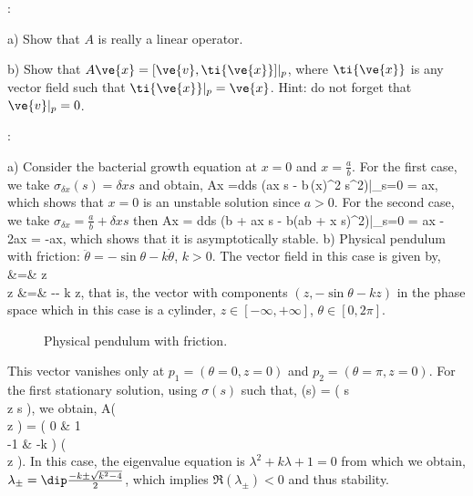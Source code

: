 \espa
\noi
{}:

\noi
a) Show that $A$ is really a linear operator.

\espa
\noi
b) Show that $A\ve{x} = [\ve{v},\ti{\ve{x}}]|_p$, where $\ti{\ve{x}}$ is any vector field such that $\ti{\ve{x}}|_p = \ve{x}$. Hint: do not forget that $\ve{v}|_p = 0$.

\espa
\noi{}:

\noi a) Consider the bacterial growth equation at $x=0$ and $x = \frac ab$. For the first case, we take $\sigma_{\delta x}(s) = \delta x s$ and obtain,
\beq 
A\delta x =\frac d{ds} (a\delta x s - b\,(\delta x)^2 s^2)|_{s=0} = a\delta x,
\eeq
which shows that $x=0$ is an unstable solution since $a>0$. For the second case, we take $\sigma_{\delta x} = \frac ab + \delta x s$ then
\beq 
A\delta x = \frac d{ds} (b  + a\delta x s - b(\frac ab + \delta x s)^2)|_{s=0} 
= a\delta x - 2a\delta x = -a\delta x,
\eeq
which shows that it is asymptotically stable.
\espa
\noi
b) Physical pendulum with friction: $\ddot \theta = - \sin \theta - k \dot \theta$, $k>0$. The vector field in this case is given by,
\beq {}
\dot \theta &=& z \\
     \dot z &=& -\sin \theta - k z,
\earr
\eeq
that is, the vector with components $(z, -\sin \theta - kz)$ in the phase space which in this case is a cylinder, $z \in [-\infty,+\infty]$, $\theta \in [0,2\pi]$.      

\espa 
\begin{figure}[htbp]
  \begin{center}
    \caption{Physical pendulum with friction.}
    \label{fig:6_2}
  \end{center}
\end{figure}

This vector vanishes only at $p_1 = (\theta =0, z=0)$ and $p_2 = (\theta = \pi, z=0)$. For the first stationary solution, using $\sigma(s)$ such that,
\beq 
 \phi \circ \sigma (s) = 
\left( \delta \theta \;s \\ 
             \delta z \;s 
             \earr \right),
\eeq
we obtain,
\beq
 A\left(  \delta \theta \\ 
                 \delta z 
           \earr \right) = \left(  0 & 1 \\ 
                                          -1 & -k 
                           \earr \right)  
                           \left(  \delta \theta \\ \delta z 
                           \earr \right). 
\eeq
In this case, the eigenvalue equation is $\lambda^2 + k \lambda +1 =0$ from which we obtain,
$\lambda_{\pm} = \dip\frac{-k \pm \sqrt{k^2 - 4}}{2}$, which implies $\Re (\lambda_{\pm}) <0$ and thus stability.

